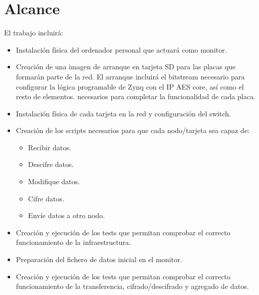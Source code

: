 \section{Alcance}
El trabajo incluirá:
\begin{itemize}
	\item Instalación física del ordenador personal que actuará como monitor.
	\item Creación de una imagen de arranque en tarjeta SD para las placas que formarán parte de la red. El arranque incluirá el bitstream necesario para configurar la lógica programable de Zynq con el IP AES core, así como el resto de elementos.
	necesarios para completar la funcionalidad de cada placa.
	\item Instalación física de cada tarjeta en la red y configuración del switch.
	\item Creación de los scripts necesarios para que cada nodo/tarjeta sea capaz de:
	\begin{itemize}
		\item Recibir datos.
		\item Descifre datos.
		\item Modifique datos.
		\item Cifre datos.
		\item Envíe datos a otro nodo.
	\end{itemize}
	\item Creación y ejecución de los tests que permitan comprobar el correcto funcionamiento de la infraestructura.
	\item Preparación del fichero de datos inicial en el monitor.
	\item Creación y ejecución de los tests que permitan comprobar el correcto funcionamiento de la transferencia, cifrado/descifrado y agregado de datos.
\end{itemize}